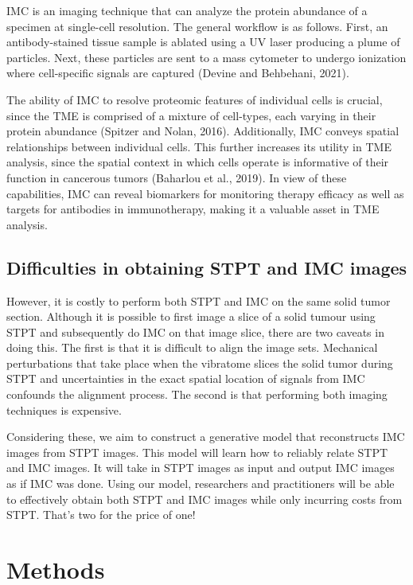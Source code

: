\documentclass[10pt,twocolumn,letterpaper]{article}
\begin{document}
IMC is an imaging technique that can analyze the protein abundance of a specimen at single-cell resolution. The general workflow is as follows. First, an antibody-stained tissue sample is ablated using a UV laser producing a plume of particles. Next, these particles are sent to a mass cytometer to undergo ionization where cell-specific signals are captured (Devine and Behbehani, 2021).

The ability of IMC to resolve proteomic features of individual cells is crucial, since the TME is comprised of a mixture of cell-types, each varying in their protein abundance (Spitzer and Nolan, 2016). Additionally, IMC conveys spatial relationships between individual cells. This further increases its utility in TME analysis, since the spatial context in which cells operate is informative of their function in cancerous tumors (Baharlou et al., 2019). In view of these capabilities, IMC can reveal biomarkers for monitoring therapy efficacy as well as  targets for antibodies in immunotherapy, making it a valuable asset in TME analysis. 

\subsection{Difficulties in obtaining STPT and IMC images}
However, it is costly to perform both STPT and IMC on the same solid tumor section. Although it is possible to first image a slice of a solid tumour using STPT and subsequently do IMC on that image slice, there are two caveats in doing this. The first is that it is difficult to align the image sets. Mechanical perturbations that take place when the vibratome slices the solid tumor during STPT and uncertainties in the exact spatial location of signals from IMC confounds the alignment process. The second is that performing both imaging techniques is expensive.

Considering these, we aim to construct a generative model that reconstructs IMC images from STPT images. This model will learn how to reliably relate STPT and IMC images. It will take in STPT images as input and output IMC images as if IMC was done. Using our model, researchers and practitioners will be able to effectively obtain both STPT and IMC images while only incurring costs from STPT. That’s two for the price of one!

\section{Methods}
\label{sec:methods}
\end{document}
